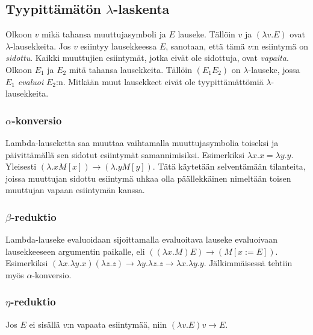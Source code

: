 \documentclass[a4paper,12pt]{amsart}
\begin{document}
\subsection{Tyypittämätön $\lambda$-laskenta}
Olkoon $v$ mikä tahansa muuttujasymboli ja $E$ lauseke. Tällöin $v$ ja $(\lambda v.E)$ ovat $\lambda$-lausekkeita. Jos $v$ esiintyy lausekkeessa $E$, sanotaan, että tämä $v$:n esiintymä on \emph{sidottu}. Kaikki muuttujien esiintymät, jotka eivät ole sidottuja, ovat \emph{vapaita}. Olkoon $E_1$ ja $E_2$ mitä tahansa lausekkeita. Tällöin $(E_1 E_2)$ on $\lambda$-lauseke, jossa $E_1$ \emph{evaluoi} $E_2$:n. Mitkään muut lausekkeet eivät ole tyypittämättömiä $\lambda$-lausekkeita. \cite{lambdalaskenta}
\subsubsection{$\alpha$-konversio}
Lambda-lauseketta saa muuttaa vaihtamalla muuttujasymbolia toiseksi ja päivittämällä sen sidotut esiintymät samannimisiksi. Esimerkiksi $\lambda x.x=\lambda y.y$. Yleisesti $(\lambda.x M[x])\to(\lambda.y M[y])$. Tätä käytetään selventämään tilanteita, joissa muuttujan sidottu esiintymä uhkaa olla päällekkäinen nimeltään toisen muuttujan vapaan esiintymän kanssa.
\subsubsection{$\beta$-reduktio}
Lambda-lauseke evaluoidaan sijoittamalla evaluoitava lauseke evaluoivaan lausekkeeseen argumentin paikalle, eli $((\lambda x.M)E)\to(M[x:=E])$. Esimerkiksi $(\lambda x.\lambda y.x)(\lambda z.z)\to\lambda y.\lambda z.z\to\lambda x.\lambda y.y$. Jälkimmäisessä tehtiin myös $\alpha$-konversio.
\subsubsection{$\eta$-reduktio}
Jos $E$ ei sisällä $v$:n vapaata esiintymää, niin $(\lambda v.E)v\to E$.
\end{document}
